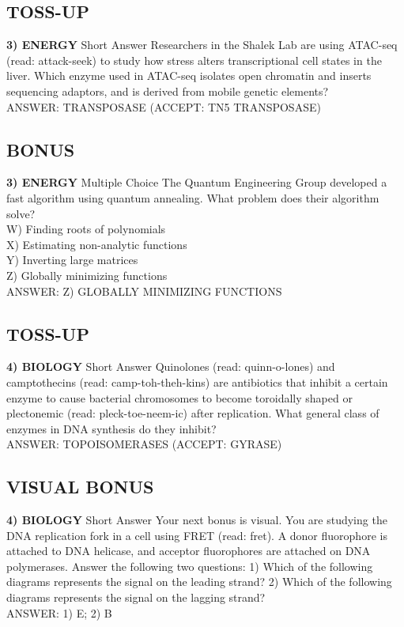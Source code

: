 \documentclass{article}
\begin{document}
\subsection*{TOSS-UP}
\textbf{3) ENERGY} Short Answer Researchers in the Shalek Lab are using ATAC-seq (read: attack-seek) to study how stress alters transcriptional cell states in the liver. Which enzyme used in ATAC-seq isolates open chromatin and inserts sequencing adaptors, and is derived from mobile genetic elements?
\\ANSWER: TRANSPOSASE (ACCEPT: TN5 TRANSPOSASE)

\subsection*{BONUS}
\textbf{3) ENERGY} Multiple Choice The Quantum Engineering Group developed a fast algorithm using quantum annealing. What problem does their algorithm solve?
\\W) Finding roots of polynomials
\\X) Estimating non-analytic functions
\\Y) Inverting large matrices
\\Z) Globally minimizing functions
\\ANSWER: Z) GLOBALLY MINIMIZING FUNCTIONS

\subsection*{TOSS-UP}
\textbf{4) BIOLOGY} Short Answer Quinolones (read: quinn-o-lones) and camptothecins (read: camp-toh-theh-kins) are antibiotics that inhibit a certain enzyme to cause bacterial chromosomes to become toroidally shaped or plectonemic (read: pleck-toe-neem-ic) after replication. What general class of enzymes in DNA synthesis do they inhibit?
\\ANSWER: TOPOISOMERASES (ACCEPT: GYRASE)

\subsection*{VISUAL BONUS}
\textbf{4) BIOLOGY} Short Answer Your next bonus is visual. You are studying the DNA replication fork in a cell using FRET (read: fret). A donor fluorophore is attached to DNA helicase, and acceptor fluorophores are attached on DNA polymerases. Answer the following two questions: 1) Which of the following diagrams represents the signal on the leading strand? 2) Which of the following diagrams represents the signal on the lagging strand?
\\ANSWER: 1) E; 2) B
\end{document}

